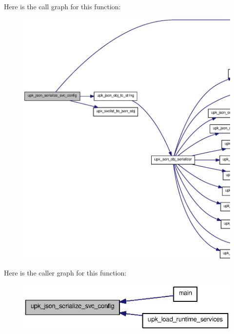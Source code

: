 Here is the call graph for this function:
\nopagebreak
\begin{figure}[H]
\begin{center}
\leavevmode
\includegraphics[width=400pt]{group__config__impl_ga19d2bc0bd2e96a937820f26f4e56b2d9_cgraph}
\end{center}
\end{figure}




Here is the caller graph for this function:
\nopagebreak
\begin{figure}[H]
\begin{center}
\leavevmode
\includegraphics[width=366pt]{group__config__impl_ga19d2bc0bd2e96a937820f26f4e56b2d9_icgraph}
\end{center}
\end{figure}


